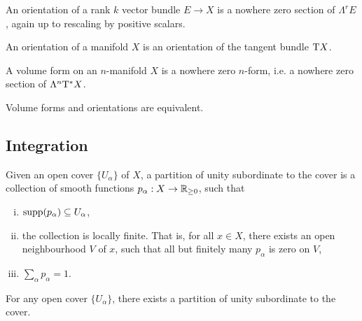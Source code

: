 \begin{definition}
     An orientation of a rank \(k\) vector bundle \(E \to X\) is a nowhere zero section of \(\Lambda^rE\), again up to rescaling by positive scalars.
\end{definition}

\begin{definition}
     An orientation of a manifold \(X\) is an orientation of the tangent bundle \(\mathrm{T} X\).
\end{definition}

\begin{definition}
     A volume form on an \(n\)-manifold \(X\) is a nowhere zero \(n\)-form, i.e. a nowhere zero section of \(\Lambda^n\mathrm{T}^*X\).
\end{definition}

\begin{proposition}
    Volume forms and orientations are equivalent.
\end{proposition}

\subsection{Integration}

\begin{definition}
     Given an open cover \(\{U_\alpha\}\) of \(X\), a partition of unity subordinate to the cover is a collection of smooth functions \(p_\alpha : X \to \mathbb{R}_{\ge 0}\), such that

    \begin{enumerate}[(i)]
        \item \(\operatorname{supp}(p_\alpha) \subseteq U_\alpha\),
        \item the collection is locally finite. That is, for all \(x \in X\), there exists an open neighbourhood \(V\) of \(x\), such that all but finitely many \(p_\alpha\) is zero on \(V\),
        \item \(\sum_\alpha p_\alpha = 1\).
    \end{enumerate}
\end{definition}

\begin{lemma}
    For any open cover \(\{U_\alpha\}\), there exists a partition of unity subordinate to the cover.
\end{lemma}

